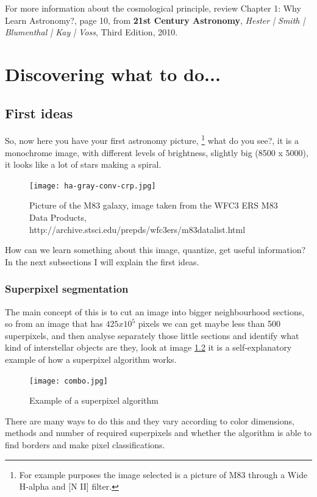 \documentclass[11pt,fleqn]{book} %
\begin{document}
\begin{remark}
For more information about the cosmological principle, review Chapter 1: Why Learn Astronomy?, page 10, from \textbf{21st Century Astronomy}, \textit{Hester | Smith | Blumenthal | Kay | Voss}, Third Edition, 2010.
\end{remark}




\chapter{Discovering what to do...}

\section{First ideas}
So, now here you have your first astronomy picture, \footnote{For example purposes the image selected is a picture of M83 through a Wide H-alpha and [N II] filter. } what do you see?, it is a monochrome image, with different levels of brightness, slightly big (8500 x 5000), it looks like a lot of stars making a spiral.
\begin{figure}[h]
    \centering
    \texttt{[image: ha-gray-conv-crp.jpg]}
    \caption{Picture of the M83 galaxy, image taken from the WFC3 ERS M83 Data Products, http://archive.stsci.edu/prepds/wfc3ers/m83datalist.html}
    \label{fig:awesome_image}
\end{figure}

How can we learn something about this image, quantize, get useful information? In the next subsections I will explain the first ideas.

\subsection{Superpixel segmentation}
The main concept of this is to cut an image into bigger neighbourhood sections, so from an image that has $425x10^5$ pixels we can get maybe less than 500 superpixels, and then analyse separately those little sections and identify what kind of interstellar objects are they, look at image \ref{fig:super} it is a self-explanatory example of how a superpixel algorithm works.
\begin{figure}[h]
    \centering
    \texttt{[image: combo.jpg]}
    \caption{Example of a superpixel algorithm}
    \label{fig:super}
\end{figure}
There are many ways to do this and they vary according to color dimensions, methods and number of required superpixels and whether the algorithm is able to find borders and make pixel classifications.
\end{document}

